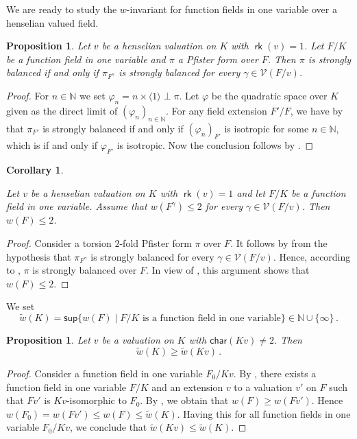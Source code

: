 \documentclass[twoside,11pt]{amsart}
\numberwithin{equation}{section}
\newtheorem{prop}[equation]{Proposition}
\newtheorem{cor}[equation]{Corollary}
\theoremstyle{definition}
\newcommand{\car}{\mathsf{char}}
\newcommand{\vf}{\varphi}
\newcommand{\nat}{\mathbb{N}}
\newcommand{\la}{\langle}
\newcommand{\ra}{\rangle}
\renewcommand{\leq}{\leqslant}
\renewcommand{\geq}{\geqslant}
\newcommand\rk{\operatorname{\mathsf{rk}}}
\newcommand{\mc}{\mathcal}
\renewcommand{\leq}{\leqslant}
\renewcommand{\geq}{\geqslant}
\renewcommand{\sup}{\mathsf{sup}}
\newcommand{\wt}{\widetilde}
\begin{document}
We are ready to study the $w$-invariant for function fields in one variable over a henselian valued field. 

\begin{prop}\label{LG-strongly-balanced-Pfister}
    Let $v$ be a henselian valuation on $K$ with $\rk(v)=1$.
    Let $F/K$ be a function field in one variable and $\pi$ a Pfister form over $F$.
    Then $\pi$ is strongly balanced if and only if $\pi_{F^\gamma}$ is strongly balanced for every $\gamma\in\mc{V}(F/v)$.
\end{prop}


\begin{proof}
For $n\in\nat$ we set $\vf_n=n\times\la 1\ra\perp \pi$.
Let $\vf$ be the quadratic space over $K$ given as the direct limit of $(\vf_n)_{n\in\nat}$.
For any field extension $F'/F$,
we have by  that $\pi_{F'}$ is strongly balanced if and only if $(\vf_n)_{F'}$ is isotropic for some $n\in\nat$, which is if and only if $\vf_{F'}$ is isotropic.
Now the conclusion follows by .
\end{proof}

\begin{cor}\label{LG-w2}

    Let $v$ be a henselian valuation on $K$ with $\rk(v)=1$ and let $F/K$ be a function field in one variable.
    Assume that $w(F^\gamma)\leq 2$ for every $\gamma\in\mc{V}(F/v)$.
    Then $w(F)\leq 2$.
\end{cor}
\begin{proof}
    Consider a torsion $2$-fold Pfister form $\pi$ over $F$.
    It follows by  from the hypothesis that $\pi_{F^\gamma}$ is strongly balanced for every $\gamma\in\mc{V}(F/v)$.
    Hence, according to , $\pi$ is strongly balanced over $F$.
    In view of , this argument shows that $w(F)\leq 2$.
\end{proof}

We set 
$$\wt{w}(K)=\sup \{w(F)\mid F/K \mbox{ is a function field in one variable}\}\in \nat \cup \{\infty\}\,.$$


\begin{prop}\label{tilde}
   Let $v$ be a valuation on $K$ with $\car(Kv)\neq 2$. Then 
   $$\wt{w}(K)\geq\wt{w}(Kv)\,.$$
\end{prop}
\begin{proof}
  Consider a function field in one variable $F_0/Kv$. By  \cite[Lemma 5.6]{BDGMZ23}, there exists a function field in one variable $F/K$ and an extension $v$ to a valuation $v'$ on $F$ such that $Fv'$ is $Kv$-isomorphic to $F_0$.
  By , we obtain that $w(F)\geq w(Fv')$. 
  Hence $w(F_0)=w(Fv')\leq w(F)\leq \wt{w}(K)$. Having this for all function fields in one variable $F_0/Kv$, we conclude that $\wt{w}(Kv)\leq \wt{w}(K)$.  
\end{proof}
\end{document}
